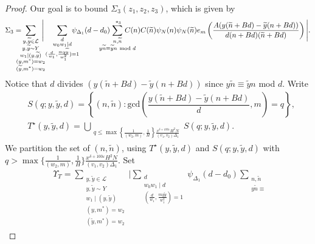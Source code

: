 \documentclass{amsart}
\numberwithin{equation}{section}
\begin{document}
\begin{proof}
Our goal is to bound $\Sigma_3(z_1,z_2,z_3)$, which is given by
\begin{align*}
\Sigma_3= \!\!\!\!\!\! \sum_{\substack{y, \widetilde{y} \in \mathcal{L} \\ y, \widetilde{y} \sim Y \\ w_1 \mid (y, \widetilde{y}) \\ (y, m^*)=w_2 \\ (\widetilde{y}, m^*)=w_2}}\!\!\!\!\Bigg|\sum_{\substack{d \\ w_0w_1 \mid d  \\  (\frac{d}{w_1}, \frac{my\widetilde{y}}{w_1^2})=1}} \!\!\!\!\!\!\!\psi_{\Delta_1}(d-d_0) \!\!\!\!\!\!\!\!\!\!\sum_{\substack{n, \widetilde{n} \\ y\widetilde{n} \equiv 
\widetilde{y}n  \mbox{ \scriptsize mod } d}}^{\,\,*_3} \!\!\!\!\!\!\!\!\!\! C(n)  C(\widetilde{n})\psi_N(n)\psi_N(\widetilde{n}) e_{m}\left(\dfrac{A (y(\widetilde{n}+B d)-  \widetilde{y}(n+B d))}{d(n+B d)(\widetilde{n}+B d)}\right)\Bigg|.
\end{align*}
 Notice that $d$ divides $(y(\widetilde{n}+B d)-  \widetilde{y}(n+B d))$ since $y\widetilde{n} \equiv 
\widetilde{y}n $ mod $d$. Write 
\begin{align*}
&S(q;y,\widetilde{y},d) = \left\{ (n,\widetilde{n}): \mbox{gcd}\left( \dfrac{y(\widetilde{n}+B d)-  \widetilde{y}(n+B d)}{d}, m \right) = q\right\}, \\
&T^\star(y,\widetilde{y},d) = \bigcup_{\substack{  q \leq \max\left\{\tfrac{1}{(w_2,m)}, \tfrac{1}{H}\right\} \tfrac{x^{\delta+100\varepsilon}H^2 N}{(v_1,v_2)\Delta_1}  }} S(q;y,\widetilde{y},d) .
\end{align*} 
We  partition the set of $(n, \widetilde{n})$, using $T^\star(y,\widetilde{y},d)$ and $S(q;y,\widetilde{y},d)$ with $q >\max\{\tfrac{1}{(w_2,m)}, \tfrac{1}{H}\} \tfrac{x^{\delta+100\varepsilon}H^2 N}{(v_1,v_2)\Delta_1}$. Set 
\begin{align*}
&\Upsilon_T=\sum_{\substack{y, \widetilde{y}\in \mathcal{L} \\ y, \widetilde{y} \sim Y \\ w_1 \mid (y, \widetilde{y}) \\ (y,m^*)=w_2 \\ (\widetilde{y},m^*)=w_2}}\Bigg|\sum_{\substack{d \\ w_0w_1 \mid d  \\  (\frac{d}{w_1}, \frac{my\widetilde{y}}{w_1^2})=1}} \!\!\!\!\!\!\!\psi_{\Delta_1}(d-d_0) \!\!\!\!\!\!\!\!\sum_{\substack{n, \widetilde{n} \\  y\widetilde{n} \equiv 
}}
\end{align*}
\end{proof}
\end{document}

